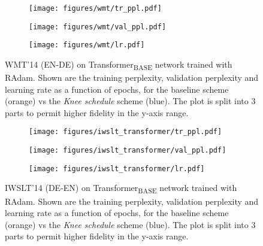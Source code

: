 \documentclass{article} \usepackage{iclr2021_conference,times}
\newcommand{\lrschedule}{\textit{Knee schedule}}
\begin{document}
\begin{figure}[h]
    \begin{subfigure}[t]{\textwidth}
        \centering
        \texttt{[image: figures/wmt/tr\_ppl.pdf]}
        \label{fig:wmt_tr_loss}
    \end{subfigure}
    \begin{subfigure}[t]{\textwidth}
        \centering
        \texttt{[image: figures/wmt/val\_ppl.pdf]}
        \label{fig:wmt_test_acc}
    \end{subfigure}
    \begin{subfigure}[t]{\textwidth}
        \centering
        \texttt{[image: figures/wmt/lr.pdf]}
        \label{fig:wmt_lr}
    \end{subfigure}
\caption{WMT'14 (EN-DE) on Transformer\textsubscript{BASE} network trained with RAdam. Shown are the training perplexity, validation perplexity and learning rate as a function of epochs, for the baseline scheme (orange) vs the \lrschedule{} scheme (blue). The plot is split into 3 parts to permit higher fidelity in the y-axis range.}
\label{fig:wmt_radam_lrl}
\end{figure}


\begin{figure}[h]
    \begin{subfigure}[t]{\textwidth}
        \centering
        \texttt{[image: figures/iwslt\_transformer/tr\_ppl.pdf]}
        \label{fig:iwslt_adam_tr_loss}
    \end{subfigure}
    \begin{subfigure}[t]{\textwidth}
        \centering
        \texttt{[image: figures/iwslt\_transformer/val\_ppl.pdf]}
        \label{fig:iwslt_adam_test_acc}
    \end{subfigure}
    \begin{subfigure}[t]{\textwidth}
        \centering
        \texttt{[image: figures/iwslt\_transformer/lr.pdf]}
        \label{fig:iwslt_adam_lr}
    \end{subfigure}
\caption{IWSLT'14 (DE-EN) on Transformer\textsubscript{BASE} network trained with RAdam. Shown are the training perplexity, validation perplexity and learning rate as a function of epochs, for the baseline scheme (orange) vs the \lrschedule{} scheme (blue). The plot is split into 3 parts to permit higher fidelity in the y-axis range.}
\label{fig:iwslt_adam_result}
\end{figure}
\end{document}
